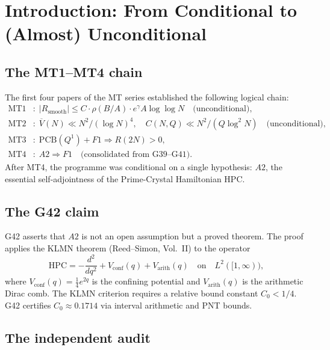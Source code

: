 \documentclass[11pt,a4paper]{article}
\begin{document}
\tableofcontents

\section{Introduction: From Conditional to (Almost) Unconditional}

\subsection{The MT1--MT4 chain}

The first four papers of the MT series established the following logical chain:
\begin{align*}
\text{MT1} &:\; |R_{\text{smooth}}| \le C\cdot\rho(B/A)\cdot e^\gamma A\log\log N \quad\text{(unconditional)}, \\
\text{MT2} &:\; \overline{V}(N) \ll N^2/(\log N)^4,\quad C(N,Q)\ll N^2/(Q\log^2 N) \quad\text{(unconditional)}, \\
\text{MT3} &:\; \text{PCB}(Q^1) + F1 \Longrightarrow R(2N)>0, \\
\text{MT4} &:\; A2 \Longrightarrow F1 \quad\text{(consolidated from G39--G41)}.
\end{align*}
After MT4, the programme was conditional on a single hypothesis: $A2$, the essential self-adjointness of the Prime-Crystal Hamiltonian $\mathrm{HPC}$.

\subsection{The G42 claim}

G42 asserts that $A2$ is not an open assumption but a proved theorem.  The proof applies the KLMN theorem (Reed--Simon, Vol.~II) to the operator
\[
\mathrm{HPC} = -\frac{d^2}{dq^2} + V_{\text{conf}}(q) + V_{\text{arith}}(q) \quad\text{on}\quad L^2([1,\infty)),
\]
where $V_{\text{conf}}(q) = \tfrac{1}{4}e^{2q}$ is the confining potential and $V_{\text{arith}}(q)$ is the arithmetic Dirac comb.  The KLMN criterion requires a relative bound constant $C_0 < 1/4$.  G42 certifies $C_0\approx 0.1714$ via interval arithmetic and PNT bounds.

\subsection{The independent audit}
\end{document}

